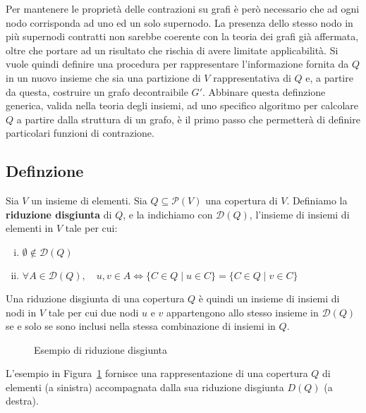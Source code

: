 Per mantenere le proprietà delle contrazioni su grafi è però necessario che ad ogni nodo corrisponda ad uno ed un solo
supernodo.
La presenza dello stesso nodo in più supernodi contratti non sarebbe coerente con la teoria dei grafi
già affermata, oltre che portare ad un risultato che rischia di avere limitate applicabilità.
Si vuole quindi definire una procedura per rappresentare l'informazione fornita da $Q$ in un nuovo insieme che sia una
partizione di $V$ rappresentativa di $Q$ e, a partire da questa, costruire un grafo decontraibile $G'$.
Abbinare questa definzione generica, valida nella teoria degli insiemi, ad uno specifico algoritmo per calcolare
$Q$ a partire dalla struttura di un grafo, è il primo passo che permetterà di definire particolari funzioni di
contrazione.

\subsection{Definzione}

\begin{definition}
Sia $V$ un insieme di elementi. Sia $Q \subseteq \mathcal{P}(V)$ una copertura di $V$.
Definiamo la \textbf{riduzione disgiunta} di $Q$, e la indichiamo con $\mathcal{D}(Q)$,
l'insieme di insiemi di elementi in $V$ tale per cui:
\begin{enumerate}[(i)]
    \item $\emptyset \notin \mathcal{D}(Q)$
    \item $\forall A \in \mathcal{D}(Q), \quad u, v \in A \Leftrightarrow \{C \in Q \mid u \in C\} = \{C \in Q \mid v \in C\}$
\end{enumerate}
\end{definition}

Una riduzione disgiunta di una copertura $Q$ è quindi un insieme di insiemi di nodi in $V$ tale per cui due
nodi $u$ e $v$ appartengono allo stesso insieme in $\mathcal{D}(Q)$ se e solo se sono inclusi nella stessa combinazione
di insiemi in $Q$. \newline

\begin{figure}[!h] \centering

\caption{Esempio di riduzione disgiunta}
\label{fig:disjoint_reduction_example}
\end{figure}

L'esempio in Figura~\ref{fig:disjoint_reduction_example} fornisce una rappresentazione di una copertura $Q$ di
elementi (a sinistra) accompagnata dalla sua riduzione disgiunta $D(Q)$ (a destra).

